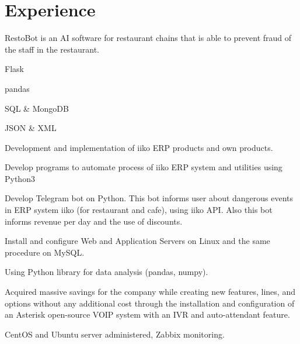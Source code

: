 \documentclass[]{deedy-resume-openfont}
\begin{document}
\hfill
\begin{minipage}[t]{0.66\textwidth} 


\section{Experience}

RestoBot is an AI software for restaurant chains that is able to prevent fraud of the staff in the restaurant.
\vspace{\topsep} %
\begin{tightemize}
\item Flask
\item pandas
\item SQL \& MongoDB
\item JSON \& XML
\end{tightemize}
\sectionsep

Development and implementation of iiko ERP products  and own products.
\begin{tightemize}
\item Develop programs to automate process of iiko ERP system and utilities using Python3
\item Develop Telegram bot on Python. This bot informs user about dangerous events in ERP system iiko (for restaurant and cafe), using iiko API. Also this bot informs revenue per day and the use of discounts.
\item Install and configure Web and Application Servers on Linux and the same procedure on MySQL.
\item Using Python library for data analysis (pandas, numpy).
\item Acquired massive savings for the company while creating new features, lines, and options without any additional cost through the installation and configuration of an Asterisk open-source VOIP system with an IVR and auto-attendant feature.
\item CentOS and Ubuntu server administered, Zabbix monitoring.
\end{tightemize}
\sectionsep


\end{minipage}
\end{document}
